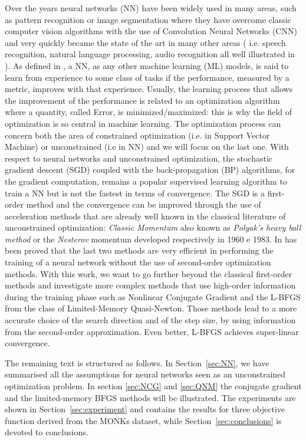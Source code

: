\documentclass[11pt]{article}
\begin{document}
Over the years neural networks (NN) have been widely used in many areas, such as pattern recognition or image segmentation where they have overcome classic computer vision algorithms with the use of Convolution Neural Networks (CNN) \cite{DBLP:journals/corr/BadrinarayananK15} and very quickly became the state of the art in many other areas ( i.e. speech recognition, natural language processing, audio recognition all well illustrated in \cite{Goodfellow-et-al-2016}). 
As defined in \cite{Mitchell97}, a NN, as any other machine learning (ML) models, is said to learn from experience to some class of tasks if the performance, measured by a metric, improves with that experience.
Usually, the learning process that allows the improvement of the performance is related to an optimization algorithm where a quantity, called Error, is minimized/maximized: this is why the field of optimization is so central in machine learning. The optimization process can concern both the area of constrained optimization (i.e. in Support Vector Machine) or unconstrained (i.e in NN) and we will focus on the last one. With respect to neural networks and unconstrained optimization, the stochastic gradient descent (SGD) coupled with the back-propagation (BP) algorithms, for the gradient computation, remains a popular supervised learning algorithm to train a NN but is not the fastest in terms of convergence. 
The SGD is a first-order method and the convergence can be improved through the use of acceleration methods that are already well known in the classical literature of unconstrained optimization: \textit{Classic Momentum} also known as \textit{Polyak's heavy ball method} \cite{Polyak1964} or the \textit{Nesterov} momentum \cite{10029946121} developed respectively in 1960 e 1983. In \cite{sutskever2013} has been proved that the last two methods are very efficient in performing the training of a neural network without the use of second-order optimization methods. With this work, we want to go further beyond the classical first-order methods and investigate more complex methods that use high-order information during the training phase such as Nonlinear Conjugate Gradient and the L-BFGS from the class of Limited-Memory Quasi-Newton. Those methods lead to  a more accurate choice of the search direction and of the step size, by using information
from the second-order approximation. Even better, L-BFGS achieves super-linear convergence.

The remaining text is structured as follows. In Section~\ref{sec:NN}, we have summarised all the assumptions for neural networks seen as an unconstrained optimization problem. In section \ref{sec:NCG} and \ref{sec:QNM} the conjugate gradient and the limited-memory BFGS methods will be illustrated. The experiments are shown in Section~\ref{sec:experiment} and contains the results for three objective function derived from the MONKs dataset, while Section~\ref{sec:conclusions} is devoted to conclusions.
\end{document}
